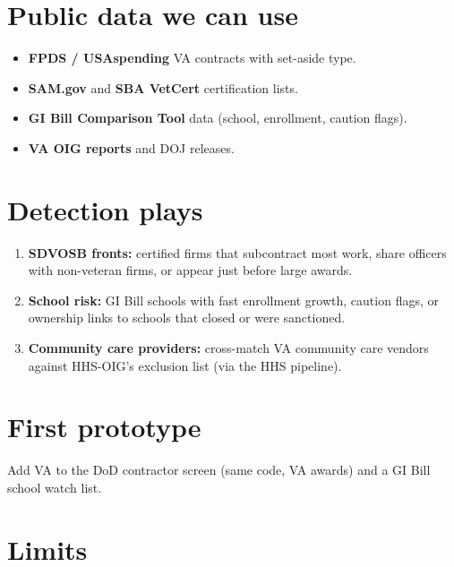 \documentclass[letterpaper,11pt]{article}
\providecommand{\tightlist}{\setlength{\itemsep}{0pt}\setlength{\parskip}{0pt}}
\begin{document}
\hypertarget{public-data-we-can-use}{%
\section{Public data we can use}\label{public-data-we-can-use}}

\begin{itemize}
\tightlist
\item
  \textbf{FPDS / USAspending} VA contracts with set-aside type.
\item
  \textbf{SAM.gov} and \textbf{SBA VetCert} certification lists.
\item
  \textbf{GI Bill Comparison Tool} data (school, enrollment, caution
  flags).
\item
  \textbf{VA OIG reports} and DOJ releases.
\end{itemize}

\hypertarget{detection-plays}{%
\section{Detection plays}\label{detection-plays}}

\begin{enumerate}
\def\labelenumi{\arabic{enumi}.}
\tightlist
\item
  \textbf{SDVOSB fronts:} certified firms that subcontract most work,
  share officers with non-veteran firms, or appear just before large
  awards.
\item
  \textbf{School risk:} GI Bill schools with fast enrollment growth,
  caution flags, or ownership links to schools that closed or were
  sanctioned.
\item
  \textbf{Community care providers:} cross-match VA community care
  vendors against HHS-OIG's exclusion list (via the HHS pipeline).
\end{enumerate}

\hypertarget{first-prototype}{%
\section{First prototype}\label{first-prototype}}

Add VA to the DoD contractor screen (same code, VA awards) and a GI Bill
school watch list.

\hypertarget{limits}{%
\section{Limits}\label{limits}}
\end{document}
